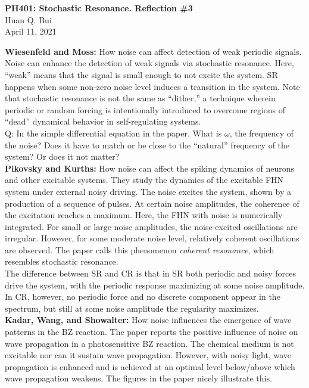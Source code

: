 \documentclass[11pt]{article}
\begin{document}
\begin{center}
{\large \bf PH401: Stochastic Resonance.  Reflection \#3}\\
{ Huan Q. Bui}\\
April 11, 2021
\end{center}

\noindent \textbf{Wiesenfeld and Moss:} How noise can affect detection of weak periodic signals.  Noise can enhance the detection of weak signals via stochastic resonance. Here, ``weak'' means that the signal is small enough to not excite the system. SR happens when some non-zero noise level induces a transition in the system. Note that stochastic resonance is not the same as ``dither,'' a technique wherein periodic or random forcing is intentionally introduced to overcome regions of ``dead'' dynamical behavior in self-regulating systems. \\


Q: In the simple differential equation in the paper. What is $\omega$, the frequency of the noise? Does it have to match or be close to the ``natural'' frequency of the system? Or does it not matter?  \\




\noindent \textbf{Pikovsky and Kurths:} How noise can affect the spiking dynamics of neurons and other excitable systems. They study the dynamics of the excitable FHN system under external noisy driving. The noise excites the system, shown by a production of a sequence of pulses. At certain noise amplitudes, the coherence of the excitation reaches a maximum. Here, the FHN with noise is numerically integrated. For small or large noise amplitudes, the noise-excited oscillations are irregular. However, for some moderate noise level, relatively coherent oscillations are observed. The paper calls this phenomenon \textit{coherent resonance}, which resembles stochastic resonance. \\

The difference between SR and CR is that in SR both periodic and noisy forces drive the system, with the periodic response maximizing at some noise amplitude. In CR, however, no periodic force and no discrete component appear in the spectrum, but still at some noise amplitude the regularity maximizes. \\



\noindent \textbf{Kadar, Wang, and Showalter:} How noise influences the emergence of wave patterns in the BZ reaction. The paper reports the positive influence of noise on wave propagation in a photosensitive BZ reaction. The chemical medium is not excitable nor can it sustain wave propagation. However, with noisy light, wave propagation is enhanced and is achieved at an optimal level below/above which wave propagation weakens. The figures in the paper nicely illustrate this.  \\
\end{document}
